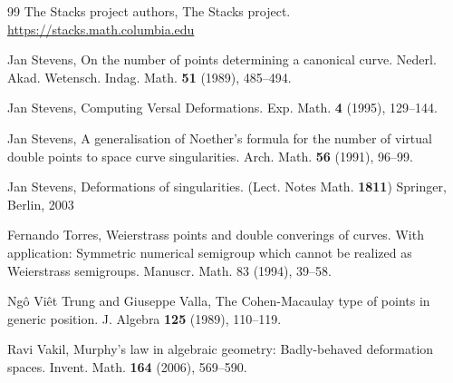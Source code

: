 \documentclass{amsart}
\theoremstyle{definition}
\theoremstyle{remark}
\begin{document}
\begin{thebibliography}{99}
The {Stacks project authors},
The Stacks project.
\url{https://stacks.math.columbia.edu}

Jan Stevens, 
On the number of points determining a canonical curve. Nederl. Akad. Wetensch. Indag. Math. {\bf 51} (1989), 485--494.

Jan Stevens, 
Computing Versal Deformations.
 Exp. Math. {\bf4} (1995), 129--144. \\

Jan Stevens, 
A  generalisation of Noether’s formula for the number of virtual double points to space curve singularities. 
Arch. Math. {\bf56} (1991), 96--99. 

Jan Stevens,  
Deformations of singularities. 
(Lect. Notes Math. {\bf1811})
Springer, Berlin, 2003



Fernando Torres,
Weierstrass points and double converings of curves. With application: Symmetric numerical semigroup which
cannot be realized as Weierstrass semigroups.
Manuscr. Math. 83 (1994), 39--58.

Ngô Viêt Trung and  Giuseppe Valla, 
The Cohen-Macaulay type of points in generic position.
J. Algebra {\bf125} (1989), 110--119.


Ravi Vakil, 
Murphy's law in algebraic geometry: {Badly}-behaved deformation spaces.
Invent. Math. {\bf164} (2006),  569--590.


\end{thebibliography}
\end{document}
